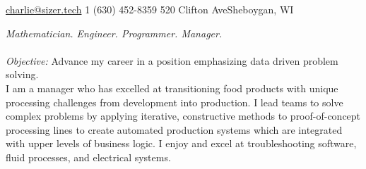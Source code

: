 \documentclass[10pt,a4paper]{article} %
\begin{document}
 



\noindent\href{mailto:charlie@sizer.tech}{charlie@sizer.tech}\bull %
\textsmaller{+}1 (630) 452-8359\bull %
520 Clifton Ave\bull Sheboygan, WI%

\spacedhrule{0.9em}{-0.4em} %



\vspace{-1.3em} %

\begin{multicols}{2}  %
\noindent \textit{Mathematician. Engineer. Programmer. Manager.}\\\\
\emph{Objective: }Advance my career in a position emphasizing  data driven problem solving. \\

\noindent I am a manager who has excelled at transitioning food products with unique processing challenges from development into production. I lead teams to solve complex problems by applying iterative, constructive methods to proof-of-concept processing lines to create automated production systems which are integrated with upper levels of business logic. 
I enjoy and excel at troubleshooting software, fluid processes, and electrical systems.

\end{multicols}
\end{document}

